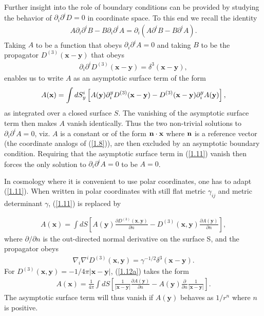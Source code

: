 \documentclass[aps,onecolumn,10pt]{revtex4}
\numberwithin{equation}{section}
\numberwithin{equation}{section}
\begin{document}
Further insight into the role of boundary conditions can be provided by studying the behavior of $\partial_i\partial^iD=0$ in coordinate space. To this end  we recall the identity
%
\begin{eqnarray}
A \partial_i\partial^iB-B \partial_i\partial^iA=\partial_i(A\partial^iB-B\partial^iA).
\label{1.9}
\end{eqnarray}
%
Taking $A$ to be a function that obeys $\partial_i\partial^iA=0$ and taking $B$ to be the propagator $D^{(3)}(\mathbf{x}-\mathbf{y})$ that obeys 
%
\begin{eqnarray}
\partial_i\partial^iD^{(3)}(\mathbf{x}-\mathbf{y})=\delta^3(\mathbf{x}-\mathbf{y}),
\label{1.10}
\end{eqnarray}
%
enables us to write $A$ as an asymptotic surface term of the form 
%
\begin{eqnarray}
A({\bf x}) =\int dS_y^i\left[A({\bf y})\partial^y_iD^{(3)}(\mathbf{x}-\mathbf{y})-D^{(3)}(\mathbf{x}-\mathbf{y})\partial^y_iA({\bf y})\right],
\label{1.11}
\end{eqnarray}
%
as integrated over a closed surface $S$. The vanishing of the asymptotic surface term then makes $A$ vanish identically. Thus the two non-trivial solutions to $\partial_i\partial^iA=0$, viz. $A$  is a constant or of the form ${\bf n}\cdot {\bf x}$ where ${\bf n}$ is a reference vector (the coordinate analogs of  (\ref{1.8})), are then excluded by an asymptotic boundary condition. Requiring that the asymptotic surface term in (\ref{1.11}) vanish then forces the only solution to $\partial_i\partial^iA=0$ to be $A=0$.

In cosmology where it is convenient to use  polar coordinates, one has to adapt (\ref{1.11}). When written  in polar coordinates with still flat metric $\gamma_{ij}$ and metric determinant $\gamma$, (\ref{1.11}) is replaced by 

%
\begin{eqnarray}
A(\textbf{x})=\int dS\left[A(\mathbf{y})\frac{\partial D^{(3)}(\mathbf{x},\mathbf{y})}{\partial  n} -D^{(3)}(\mathbf{x},\mathbf{y})\frac{\partial A(\mathbf{y})}{\partial n}\right],
\label{1.12a}
\end{eqnarray}
%
where $\partial/\partial n$ is the out-directed normal derivative on the surface S, and the propagator obeys
%
\begin{eqnarray}
\nabla_i\nabla^iD^{(3)}(\mathbf{x},\mathbf{y})=\gamma^{-1/2}\delta^3(\mathbf{x}-\mathbf{y}).
\label{1.13a}
\end{eqnarray}
%
For $D^{(3)}(\mathbf{x},\mathbf{y})=-1/4\pi|\mathbf{x}-\mathbf{y}|$, (\ref{1.12a}) takes the form
%
\begin{eqnarray}
A(\textbf{x})=\frac{1}{4\pi} \int dS\left[\frac{1}{|\mathbf{x}-\mathbf{y}|}\frac{\partial A(\mathbf{y})}{\partial n}-
A(\mathbf{y})\frac{\partial}{\partial  n}\frac{1}{|\mathbf{x}-\mathbf{y}|}\right].
\label{1.14a}
\end{eqnarray}
%
The asymptotic surface term will thus vanish if $A(\mathbf{y})$ behaves as $1/r^{n}$ where $n$ is positive.
\end{document}
